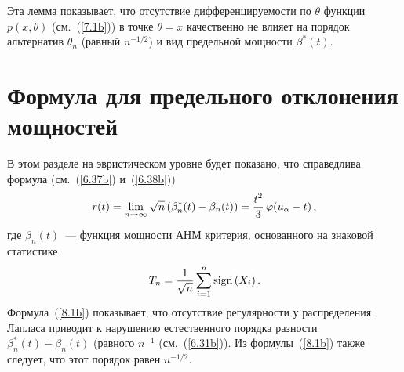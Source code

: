 \begin{multicols}{2}
\noindent
Эта лемма показывает, что отсутствие дифференцируемости по
$\theta$ функции $p(x, \theta)$ (см.~(\ref{7.1b})) в точке $\theta=x$
качественно не влияет на порядок альтернатив $\theta_n$ (равный
$n^{-1/2}$) и вид предельной мощности $\beta^*(t)$.

\section{Формула для предельного отклонения мощностей}

В этом разделе на эвристическом уровне будет показано, что справедлива
формула (см.~(\ref{6.37b}) и~(\ref{6.38b}))
\begin{equation}
r(t)=\lim_{n \to \infty}
{\sqrt {n}\,(\beta_n^*(t)-\beta_n(t))}=\displaystyle\frac{\displaystyle t^2\mathstrut}{\displaystyle 3\mathstrut}\,\varphi(u_\alpha-t)\,,
\label{8.1b}
\end{equation}
где $\beta_n(t)$~--- функция мощности АНМ критерия,
основанного на знаковой статистике
\begin{equation}
T_n=\displaystyle\frac{\displaystyle 1\mathstrut}{\displaystyle \sqrt
n\mathstrut}\sum \limits_{i=1}^n{\mathrm{sign}\left ( X_i\right )}\,.
\label{8.2b}
\end{equation}
Формула~(\ref{8.1b})
показывает, что отсутствие регулярности у распределения Лапласа
приводит к нарушению естественного порядка разности
$\beta_n^*(t)-\beta_n(t)$ (равного $n^{-1}$ (см.~(\ref{6.31b})). Из
формулы~(\ref{8.1b}) также следует, что этот порядок равен $n^{-1/2}$.


\end{multicols}
